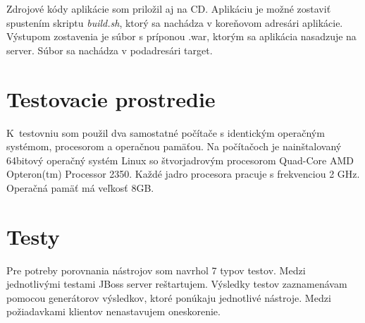 \documentclass[12pt,oneside,final]{fithesis-utf8}
\begin{document}
\par Zdrojové kódy aplikácie som priložil aj na CD. Aplikáciu je možné zostaviť spustením skriptu \textit{build.sh}, ktorý sa nachádza v koreňovom adresári aplikácie. Výstupom zostavenia je súbor s príponou .war, ktorým sa aplikácia nasadzuje na server. Súbor sa nachádza v podadresári target.

\section{Testovacie prostredie}
K~testovniu som použil dva samostatné počítače s identickým operačným systémom, procesorom a operačnou pamäťou. Na počítačoch je nainštalovaný 64bitový operačný systém Linux so štvorjadrovým procesorom Quad-Core AMD Opteron(tm) Processor 2350. Každé jadro procesora pracuje s frekvenciou 2 GHz. Operačná pamäť má veľkosť 8GB.

\section{Testy}
Pre potreby porovnania nástrojov som navrhol 7 typov testov. Medzi jednotlivými testami JBoss server reštartujem. Výsledky testov zaznamenávam pomocou generátorov výsledkov, ktoré ponúkaju jednotlivé nástroje. Medzi požiadavkami klientov nenastavujem oneskorenie.
\newline
\end{document}
